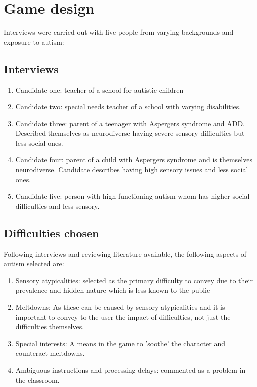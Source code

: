 \documentclass[11pt]{report}
\begin{document}
\section{Game design}
Interviews were carried out with five people from varying backgrounds and exposure to autism:

\subsection{Interviews}
\begin{enumerate}
\item Candidate one: teacher of a school for autistic children
\item Candidate two: special needs teacher of a school with varying disabilities.
\item Candidate three: parent of a teenager with Aspergers syndrome and ADD. Described themselves as neurodiverse having severe sensory difficulties but less social ones.
\item Candidate four: parent of a child with Aspergers syndrome and is themselves neurodiverse. Candidate describes having high sensory issues and less social ones.
\item Candidate five: person with high-functioning autism whom has higher social difficulties and less sensory.
\end{enumerate}

\subsection{Difficulties chosen}
Following interviews and reviewing literature available, the following aspects of autism selected are:

\begin{enumerate}
\item Sensory atypicalities: selected as the primary difficulty to convey due to their prevalence and hidden nature which is less known to the public
\item Meltdowns: As these can be caused by sensory atypicalities and it is important to convey to the user the impact of difficulties, not just the difficulties themselves.
\item Special interests: A means in the game to 'soothe' the character and counteract meltdowns.
\item Ambiguous instructions and processing delays: commented as a problem in the classroom.
\end{enumerate}
\end{document}

